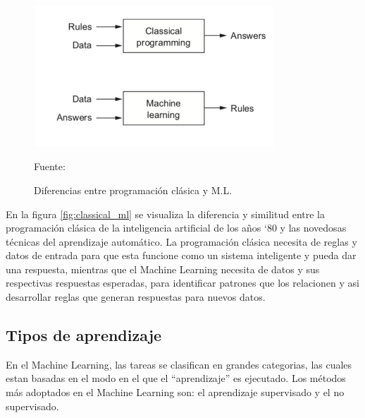 \begin{figure}[H]
    \begin{center}
        \includegraphics[width=9cm]{img/capitulo_2/machinelearning.png}
    \end{center}
    \begin{center}
        \caption{Diferencias entre programación clásica y M.L.}
        Fuente: \cite{classicprog_and_ml}
        \label{fig:prog_classical_ml}
    \end{center}
\end{figure}

En la figura \ref{fig:classical_ml} se visualiza la diferencia y similitud entre la programación clásica de la inteligencia artificial de los años `80 y las novedosas técnicas del aprendizaje automático. La programación clásica necesita de reglas y datos de entrada para que esta funcione como un sistema inteligente y pueda dar una respuesta, mientras que el Machine Learning necesita de datos y sus respectivas respuestas esperadas, para identificar patrones que los relacionen y asi desarrollar reglas que generan respuestas para nuevos datos.\\

\subsection{Tipos de aprendizaje}
En el Machine Learning, las tareas se clasifican en grandes categorias, las cuales estan basadas en el modo en el que el ``aprendizaje'' es ejecutado. Los métodos más adoptados en el Machine Learning son: el aprendizaje supervisado y el no supervisado.\\


